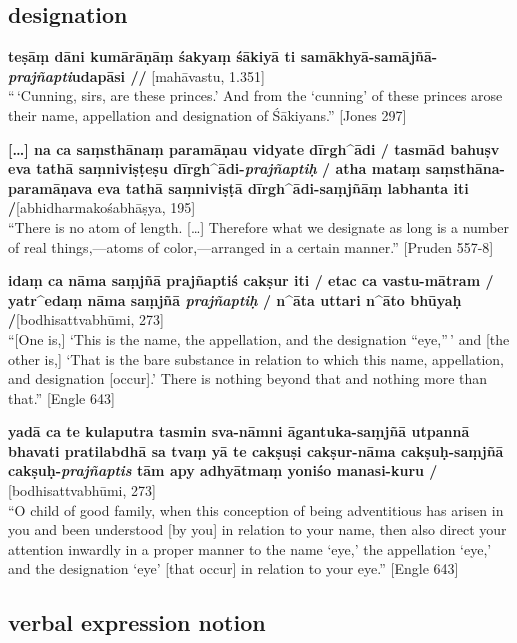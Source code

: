 \documentclass[
  letterpaper,
  DIV=11,
  numbers=noendperiod,
  oneside]{scrreprt}
\begin{document}
\hypertarget{sec-examplesdesignation}{%
\subsection{designation}\label{sec-examplesdesignation}}

\textbf{teṣāṃ dāni kumārāṇāṃ śakyaṃ śākiyā ti
samākhyā-samājñā-\emph{prajñapti}udapāsi //} {[}mahāvastu, 1.351{]}\\
``\,`Cunning, sirs, are these princes.' And from the `cunning' of these
princes arose their name, appellation and designation of Śākiyans.''
{[}Jones 297{]}

\textbf{{[}\ldots{]} na ca saṃsthānaṃ paramāṇau vidyate dīrgh\^{}ādi /
tasmād bahuṣv eva tathā saṃniviṣṭeṣu dīrgh\^{}ādi-\emph{prajñaptiḥ} /
atha mataṃ saṃsthāna-paramāṇava eva tathā saṃniviṣṭā
dīrgh\^{}ādi-saṃjñāṃ labhanta iti /}{[}abhidharmakośabhāṣya, 195{]}\\
``There is no atom of length. {[}\ldots{]} Therefore what we designate
as long is a number of real things,---atoms of color,---arranged in a
certain manner.'' {[}Pruden 557-8{]}

\textbf{idaṃ ca nāma saṃjñā prajñaptiś cakṣur iti / etac ca vastu-mātram
/ yatr\^{}edaṃ nāma saṃjñā \emph{prajñaptiḥ} / n\^{}āta uttari n\^{}āto
bhūyaḥ /}{[}bodhisattvabhūmi, 273{]}\\
``{[}One is,{]} `This is the name, the appellation, and the designation
``eye,''\,' and {[}the other is,{]} `That is the bare substance in
relation to which this name, appellation, and designation {[}occur{]}.'
There is nothing beyond that and nothing more than that.'' {[}Engle
643{]}

\textbf{yadā ca te kulaputra tasmin sva-nāmni āgantuka-saṃjñā utpannā
bhavati pratilabdhā sa tvaṃ yā te cakṣuṣi cakṣur-nāma cakṣuḥ-saṃjñā
cakṣuḥ-\emph{prajñaptis} tām apy adhyātmaṃ yoniśo manasi-kuru /}
{[}bodhisattvabhūmi, 273{]}\\
``O child of good family, when this conception of being adventitious has
arisen in you and been understood {[}by you{]} in relation to your name,
then also direct your attention inwardly in a proper manner to the name
`eye,' the appellation `eye,' and the designation `eye' {[}that occur{]}
in relation to your eye.'' {[}Engle 643{]}

\hypertarget{sec-examplesverbalexpression}{%
\subsection{verbal expression
notion}\label{sec-examplesverbalexpression}}
\end{document}
